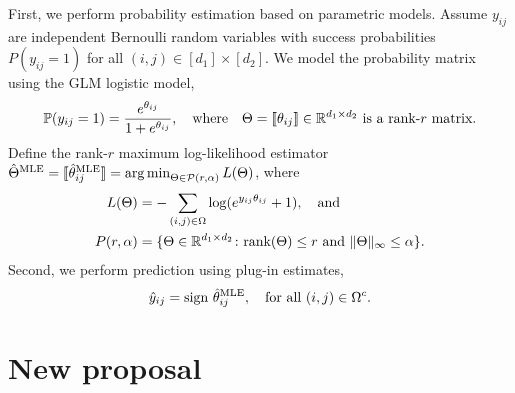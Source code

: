 \documentclass[11pt]{article}
\theoremstyle{plain}
\theoremstyle{definition}
\def\sign{\textup{sign }}
\begin{document}
First, we perform probability estimation based on parametric models. Assume $y_{ij}$ are independent Bernoulli random variables with success probabilities $P(y_{ij}=1)$ for all $(i,j)\in[d_1]\times[d_2]$. We model the probability matrix using the GLM logistic model,
\[
\mathbb{P}(y_{ij}=1)={e^{\theta_{ij}}\over 1+e^{\theta_{ij}}}, \quad \text{where}\quad \Theta=\llbracket \theta_{ij} \rrbracket\in\mathbb{R}^{d_1\times d_2} \text{ is a rank-$r$ matrix}. 
\]  
Define the rank-$r$ maximum log-likelihood estimator $\hat\Theta^{\text{MLE}} =\llbracket \hat \theta^{\text{MLE}}_{ij} \rrbracket = \operatorname*{arg\,min}_{\Theta\in\mathcal{P}(r,\alpha)} L(\Theta)$, where
\begin{align}\label{eq:MLE}
 L(\Theta)&=-\sum_{(i,j)\in\Omega}\log(e^{y_{ij}\theta_{ij}}+1),\quad \text{and}\\
 P(r,\alpha)&=\{\Theta\in\mathbb{R}^{d_1\times d_2}\colon \text{rank}(\Theta)\leq r \ \text{and}\ \lVert\Theta\rVert_\infty\leq \alpha\}.
\end{align}
Second, we perform prediction using plug-in estimates,
\[
\hat y_{ij}=\sign \hat \theta^{\text{MLE}}_{ij},\quad \text{for all $(i,j)\in\Omega^c$}.
\]

\section{New proposal}
\end{document}

